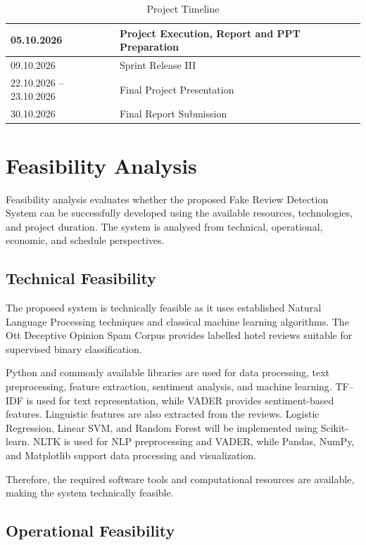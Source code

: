 \documentclass[12pt,a4paper]{report}
\begin{document}
\begin{table}[H]
\begin{tabularx}{\textwidth}{|p{3.5cm}|X|}
05.10.2026 &
Project Execution, Report and PPT Preparation \\
\hline

09.10.2026 &
Sprint Release III \\
\hline

22.10.2026 -- 23.10.2026 &
Final Project Presentation \\
\hline

30.10.2026 &
Final Report Submission \\
\hline

\end{tabularx}

\caption{Project Timeline}
\label{tab:project_timeline}
\end{table}

\section{Feasibility Analysis}

Feasibility analysis evaluates whether the proposed Fake Review Detection System can be successfully developed using the available resources, technologies, and project duration. The system is analysed from technical, operational, economic, and schedule perspectives.

\subsection{Technical Feasibility}

The proposed system is technically feasible as it uses established Natural Language Processing techniques and classical machine learning algorithms. The Ott Deceptive Opinion Spam Corpus provides labelled hotel reviews suitable for supervised binary classification.

Python and commonly available libraries are used for data processing, text preprocessing, feature extraction, sentiment analysis, and machine learning. TF--IDF is used for text representation, while VADER provides sentiment-based features. Linguistic features are also extracted from the reviews. Logistic Regression, Linear SVM, and Random Forest will be implemented using Scikit-learn. NLTK is used for NLP preprocessing and VADER, while Pandas, NumPy, and Matplotlib support data processing and visualization.

Therefore, the required software tools and computational resources are available, making the system technically feasible.

\subsection{Operational Feasibility}
\end{document}
